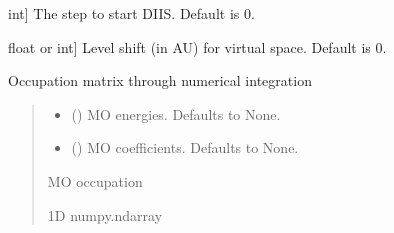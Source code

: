 \documentclass[letterpaper,10pt,english]{sphinxmanual}
\begin{document}
\begin{fulllineitems}
\begin{fulllineitems}
\begin{description}
\begin{description}
\sphinxlineitem{diis\_start\_cycle}{[}int{]}
\sphinxAtStartPar
The step to start DIIS.  Default is 0.

\sphinxlineitem{level\_shift\_factor}{[}float or int{]}
\sphinxAtStartPar
Level shift (in AU) for virtual space.  Default is 0.

\end{description}

\end{description}

\end{fulllineitems}


\begin{fulllineitems}
\label{\detokenize{fcdft.wbl:fcdft.wbl.rks.WBLMoleculeRKS.get_occ}}
\pysigstartsignatures
\pysiglinewithargsret
{}
{\sphinxparamcomma {}}
{}
\pysigstopsignatures
\sphinxAtStartPar
Occupation matrix through numerical integration
\begin{quote}\begin{description}
\begin{itemize}
\item {} 
\sphinxAtStartPar
{} (\sphinxstyleliteralemphasis{\sphinxupquote{, }}) \textendash{} MO energies. Defaults to None.

\item {} 
\sphinxAtStartPar
{} (\sphinxstyleliteralemphasis{\sphinxupquote{, }}) \textendash{} MO coefficients. Defaults to None.

\end{itemize}

\sphinxAtStartPar
MO occupation

\sphinxAtStartPar
1D numpy.ndarray

\end{description}\end{quote}


\end{fulllineitems}
\end{fulllineitems}
\end{document}
